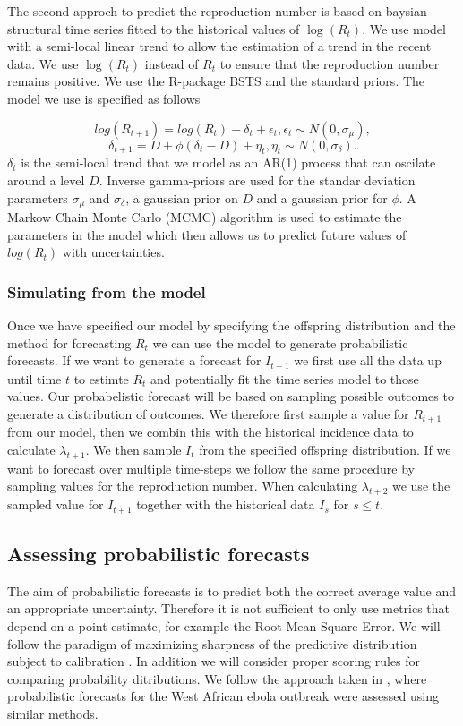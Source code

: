 \documentclass[12pt]{article}
\begin{document}
The second approch to predict the reproduction number is based on baysian structural time series fitted to the historical values of $\log(R_t)$. We use model with a semi-local linear trend to allow the estimation of a trend in the recent data. We use $\log(R_t)$ instead of $R_t$ to ensure that the reproduction number remains positive. We use the R-package BSTS \cite{scottBstsBayesianStructural2019} and the standard priors. The model we use is specified as follows

\[log(R_{t +1}) = log(R_t) + \delta_t + \epsilon_t, \epsilon_t \sim N(0, \sigma_\mu),\]
\[\delta_{t+1} = D + \phi(\delta_t - D) + \eta_t, \eta_t \sim N(0, \sigma_\delta).\]
$\delta_t$ is the semi-local trend that we model as an AR(1) process that can oscilate around a level $D$. Inverse gamma-priors are used for the standar deviation parameters $\sigma_\mu$ and $\sigma_\delta$, a gaussian prior on $D$ and a gaussian prior for $\phi$. A Markow Chain Monte Carlo (MCMC) algorithm is used to estimate the parameters in the model which then allows us to predict future values of $log(R_t)$ with uncertainties. 

\subsubsection{Simulating from the model}
Once we have specified our model by specifying the offspring distribution and the method for forecasting $R_t$ we can use the model to generate probabilistic forecasts. If we want to generate a forecast for $I_{t+1}$ we first use all the data up until time $t$ to estimte $R_t$ and potentially fit the time series model to those values. Our probabelistic forecast will be based on sampling possible outcomes to generate a distribution of outcomes. We therefore first sample a value for $R_{t+1}$ from our model, then we combin this with the historical incidence data to calculate $\lambda_{t+1}$. We then sample $I_t$ from the specified offspring distribution. If we want to forecast over multiple time-steps we follow the same procedure by sampling values for the reproduction number. When calculating $\lambda_{t+2}$ we use the sampled value for $I_{t+1}$ together with the historical data ${I_s}$ for $s\leq t$. 


\subsection{Assessing probabilistic forecasts}
The aim of probabilistic forecasts is to predict both the correct average value and an appropriate uncertainty. Therefore it is not sufficient to only use metrics that depend on a point estimate, for example the Root Mean Square Error. We will follow the paradigm of maximizing sharpness of the predictive distribution subject to calibration \cite{gneitingProbabilisticForecastsCalibration2007}. In addition we will consider proper scoring rules for comparing probability ditributions. We follow the approach taken in \cite{funkAssessingPerformanceRealtime2019}, where probabilistic forecasts for the West African ebola outbreak were assessed using similar methods.
\end{document}
